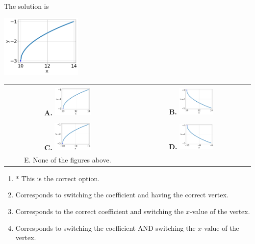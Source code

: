 \documentclass{extbook}[14pt]
\begin{document}
 
 The solution is  
 \begin{center} \includegraphics[width=0.3\textwidth]{../Figures/radicalEquationToGraphCA.png} \end{center}\begin{tabular}{|c|c|} 
\hline 
 & \tabularnewline 
 \textbf{A.} \includegraphics[width=0.3\textwidth]{../Figures/radicalEquationToGraphCA.png} & \textbf{B.} \includegraphics[width=0.3\textwidth]{../Figures/radicalEquationToGraphAA.png} \tabularnewline 
\hline 
 & \tabularnewline 
 \textbf{C.} \includegraphics[width=0.3\textwidth]{../Figures/radicalEquationToGraphDA.png} & \textbf{D.} \includegraphics[width=0.3\textwidth]{../Figures/radicalEquationToGraphBA.png} \tabularnewline 
\hline 
 E. None of the figures above. & \tabularnewline 
\hline 
 \end{tabular} 
 
\begin{enumerate}[label=\Alph*.] 
\item * This is the correct option.  
\item Corresponds to switching the coefficient and having the correct vertex.  
\item Corresponds to the correct coefficient and switching the $x$-value of the vertex.  
\item Corresponds to switching the coefficient AND switching the $x$-value of the vertex.  
\end{enumerate} 
 
\end{document}
